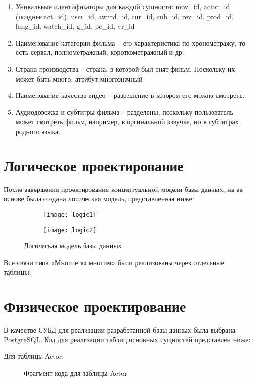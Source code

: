 \begin{enumerate}
\item Уникальные идентификаторы для каждой сущности: mov\_id, actor\_id (позднее act\_id), user\_id, award\_id,
cur\_id, sub\_id, rev\_id, prod\_id, lang\_id, watch\_id, g\_id, pc\_id, vr\_id
\item Наименование категории фильма -- его характеристика по хронометражу, то есть сериал, полнометражный, короткометражный и др.
\item Страна производства -- страна, в которой был снят фильм. Поскольку их может быть много, атрибут многозначный
\item Наименование качества видео -- разрешение в котором его можно смотреть.
\item Аудиодорожка и субтитры фильма -- разделены, поскольку пользователь может смотреть фильм, например, в оргинальной озвучке,
    но в субтитрах родного языка.
\end{enumerate}

\section{Логическое проектирование}
После завершения проектирования концептуальной модели базы данных, на ее основе была создана логическая модель,
представленная ниже:

\begin{figure} [H]
    \begin{subfigure}{.4\linewidth}
    \texttt{[image: logic1]}
    \end{subfigure}

    \begin{subfigure}{.5\linewidth}
    \texttt{[image: logic2]}
    \end{subfigure}

    \caption{Логическая модель базы данных}
    \label{logic}
\end{figure}

Все связи типа «Многие ко многим» были реализованы через отдельные таблицы.
\newpage

\section{Физическое проектирование}
В качестве СУБД для реализации разработанной базы данных была выбрана
PostgreSQL. Код для реализации таблиц основных сущностей представлен ниже:

Для таблицы Actor:
\begin{figure} [h!]
    \caption{Фрагмент кода для таблицы Actor}
\end{figure}

